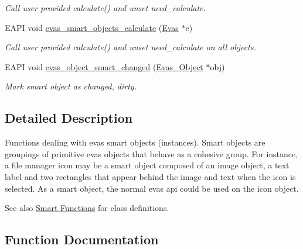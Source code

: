 \begin{DoxyCompactItemize}
\begin{DoxyCompactList}\small\item\em Call user provided calculate() and unset need\_\-calculate. \item\end{DoxyCompactList}\item 
EAPI void \hyperlink{group__Evas__Smart__Object__Group_gaa30fa648297b723a73f28632d1dbec62}{evas\_\-smart\_\-objects\_\-calculate} (\hyperlink{group__Evas__Canvas_ga5ff87cc4ce6bc43e3b640a6d37f73043}{Evas} $\ast$e)
\begin{DoxyCompactList}\small\item\em Call user provided calculate() and unset need\_\-calculate on all objects. \item\end{DoxyCompactList}\item 
EAPI void \hyperlink{group__Evas__Smart__Object__Group_ga20b3bce805c272f3d11f4ba0ae952dc6}{evas\_\-object\_\-smart\_\-changed} (\hyperlink{group__Evas__Object__Group_ga9e19e6dd1f517a0ba437c0114d3e7c97}{Evas\_\-Object} $\ast$obj)
\begin{DoxyCompactList}\small\item\em Mark smart object as changed, dirty. \item\end{DoxyCompactList}\end{DoxyCompactItemize}


\subsection{Detailed Description}
Functions dealing with evas smart objects (instances). Smart objects are groupings of primitive evas objects that behave as a cohesive group. For instance, a file manager icon may be a smart object composed of an image object, a text label and two rectangles that appear behind the image and text when the icon is selected. As a smart object, the normal evas api could be used on the icon object.

\begin{DoxySeeAlso}{See also}
\hyperlink{group__Evas__Smart__Group}{Smart Functions} for class definitions. 
\end{DoxySeeAlso}


\subsection{Function Documentation}
